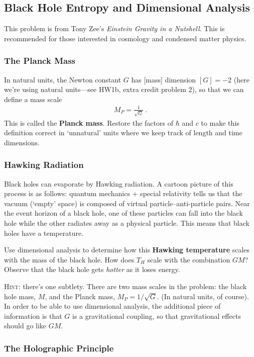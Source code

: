 \documentclass[12pt]{article}
\numberwithin{equation}{subsection}    %
\begin{document}
\subsection{Black Hole Entropy and Dimensional Analysis}

This problem is from Tony Zee's \emph{Einstein Gravity in a Nutshell}. This is recommended for those interested in cosmology and condensed matter physics.

\subsubsection{The Planck Mass}

In natural units, the Newton constant $G$ has [mass] dimension $[G] = -2$ (here we're using natural units---see HW1b, extra credit problem 2), so that we can define a mass scale
\begin{align}
	M_P = \frac{1}{\sqrt{G}} \ .
\end{align}
This is called the \textbf{Planck mass}. Restore the factors of $\hbar$ and $c$ to make this definition correct in `unnatural' units where we keep track of length and time dimensions.

\subsubsection{Hawking Radiation}

Black holes can evaporate by Hawking radiation. A cartoon picture of this process is as follows: quantum mechanics + special relativity tells us that the vacuum (`empty' space) is composed of virtual particle--anti-particle pairs. Near the event horizon of a black hole, one of these particles can fall into the black hole while the other radiates away as a physical particle. This means that black holes have a temperature. 

Use dimensional analysis to determine how this \textbf{Hawking temperature} scales with the mass of the black hole. How does $T_H$ scale with the combination $GM$? Observe that the black hole gets \emph{hotter} as it loses energy.


\textsc{Hint}: there's one subtlety. There are two mass scales in the problem: the black hole mass, $M$, and the Planck mass, $M_P = 1/\sqrt{G}$. (In natural units, of course). In order to be able to use dimensional analysis, the additional piece of information is that $G$ is a gravitational coupling, so that gravitational effects should go like $GM$. 


\subsubsection{The Holographic Principle}
\end{document}
